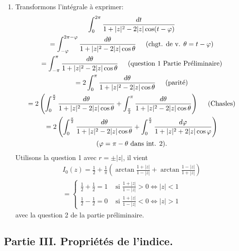 \begin{enumerate}
 \item Transformons  l'intégrale à exprimer:
\begin{multline*}
\int_0^{2\pi}\frac{dt}{1 + |z|^2 - 2|z|\cos(t-\varphi)} \\
 = \int_{-\varphi}^{2\pi - \varphi}\frac{d\theta}{1 + |z|^2 - 2|z|\cos \theta} \hspace{0.5cm} \text{(chgt. de v. $\theta = t - \varphi$)}\\
 = \int_{-\pi}^{\pi}\frac{d\theta}{1 + |z|^2 - 2|z|\cos \theta} \hspace{0.5cm} \text{(question 1 Partie Préliminaire)} \\
 = 2 \int_{0}^{\pi}\frac{d\theta}{1 + |z|^2 - 2|z|\cos \theta} \hspace{0.5cm} \text{(parité)} \\
 = 2 \left( \int_{0}^{\frac{\pi}{2}}\frac{d\theta}{1 + |z|^2 - 2|z|\cos \theta} + \int_{\frac{\pi}{2}}^{\pi}\frac{d\theta}{1 + |z|^2 - 2|z|\cos \theta}\right) \hspace{0.5cm} \text{(Chasles)} \\
 = 2 \left( \int_{0}^{\frac{\pi}{2}}\frac{d\theta}{1 + |z|^2 - 2|z|\cos \theta} + \int_{0}^{\frac{\pi}{2}}\frac{d\varphi}{1 + |z|^2 + 2|z|\cos \varphi}\right) \\
 \text{($\varphi = \pi - \theta$ dans int. 2).}
\end{multline*}
Utilisons la question 1 avec $r = \pm |z|$, il vient
\begin{multline*}
I_0(z) = \frac{1}{2} + \frac{1}{\pi}\left( \arctan\frac{1+|z|}{1-|z|} + \arctan\frac{1-|z|}{1+|z|}\right) \\
=
\left\lbrace 
\begin{aligned}
 \frac{1}{2} + \frac{1}{2}=1 &\text{ si } \frac{1+|z|}{1-|z|}>0 \Leftrightarrow |z| < 1 \\
 \frac{1}{2} - \frac{1}{2}=0 &\text{ si } \frac{1+|z|}{1-|z|}<0 \Leftrightarrow |z| > 1 
\end{aligned}
\right. 
\end{multline*}
avec la question 2 de la partie préliminaire.
\end{enumerate}


\subsection*{Partie III. Propriétés de l'indice.}

